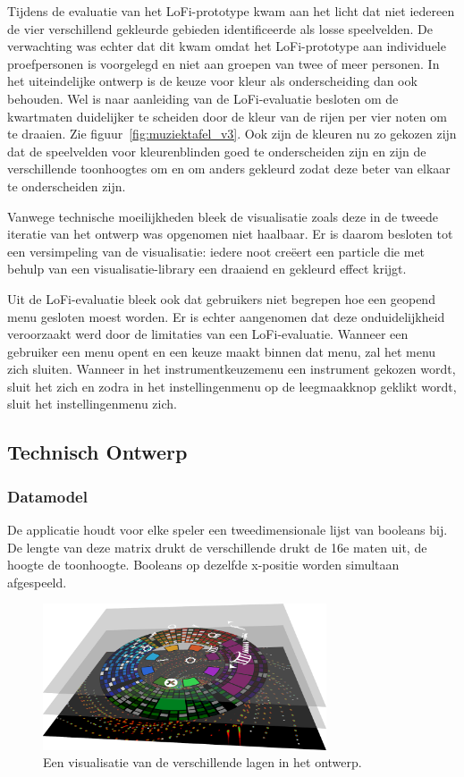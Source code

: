 \documentclass{acm}
\begin{document}
Tijdens de evaluatie van het LoFi-prototype kwam aan het licht dat niet iedereen de vier verschillend gekleurde gebieden identificeerde als losse speelvelden. De verwachting was echter dat dit kwam omdat het LoFi-prototype aan individuele proefpersonen is voorgelegd en niet aan groepen van twee of meer personen. In het uiteindelijke ontwerp is de keuze voor kleur als onderscheiding dan ook behouden. Wel is naar aanleiding van de LoFi-evaluatie besloten om de kwartmaten duidelijker te scheiden door de kleur van de rijen per vier noten om te draaien. Zie figuur~\ref{fig:muziektafel_v3}.  Ook zijn de kleuren nu zo gekozen zijn dat de speelvelden voor kleurenblinden goed te onderscheiden zijn en zijn de verschillende toonhoogtes om en om anders gekleurd zodat deze beter van elkaar te onderscheiden zijn.

Vanwege technische moeilijkheden bleek de visualisatie zoals deze in de tweede iteratie van het ontwerp was opgenomen niet haalbaar. Er is daarom besloten tot een versimpeling van de visualisatie: iedere noot cre\"eert een particle die met behulp van een visualisatie-library een draaiend en gekleurd effect krijgt.

Uit de LoFi-evaluatie bleek ook dat gebruikers niet begrepen hoe een geopend menu gesloten moest worden. Er is echter aangenomen dat deze onduidelijkheid veroorzaakt werd door de limitaties van een LoFi-evaluatie. Wanneer een gebruiker een menu opent en een keuze maakt binnen dat menu, zal het menu zich sluiten. Wanneer in het instrumentkeuzemenu een instrument gekozen wordt, sluit het zich en zodra in het instellingenmenu op de leegmaakknop geklikt wordt, sluit het instellingenmenu zich.

\subsection{Technisch Ontwerp}
\subsubsection{Datamodel}
De applicatie houdt voor elke speler een tweedimensionale lijst van booleans bij. De lengte van deze matrix drukt de verschillende drukt de 16e maten uit, de hoogte de toonhoogte. Booleans op dezelfde x-positie worden simultaan afgespeeld.

\begin{figure}
  \includegraphics[width=84mm]{img/muziektafel_layers}
  \caption{Een visualisatie van de verschillende lagen in het ontwerp.}
  \label{fig:muziektafel_layers}
\end{figure}
\end{document}
